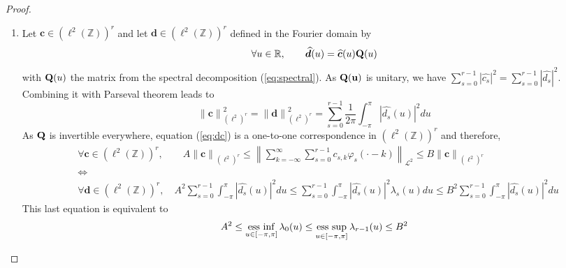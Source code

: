 \begin{proof}
\begin{enumerate}
    \item 
      Let $\bm{c} \in {(\ell^{2}(\mathbb{Z}))}^r$ and let $\bm{d} \in {(\ell^{2}(\mathbb{Z}))}^r$ defined in the Fourier 
      domain by  
      \begin{equation}\label{eq:dc}
	\forall u \in \mathbb{R}, \qquad \widehat{\bm{d}}(u) = \widehat{\bm{c}}(u)\mathbf{Q}(u)
      \end{equation}
      with $\mathbf{Q}(u)$ the matrix from the spectral decomposition (\ref{eq:spectral}). As $\mathbf{Q(u)}$ is unitary, we 
      have $\displaystyle \sum_{s=0}^{r-1} |\widehat{c_s}|^2 = \sum_{s=0}^{r-1} |\widehat{d_s}|^2$. Combining it with 
      Parseval theorem leads to
      \begin{equation*}
      {\|\bm{c}\|}_{{(\ell^2)}^r}^2 = {\|\bm{d}\|}_{{(\ell^2)}^r}^2 = \sum_{s=0}^{r-1} \frac{1}{2\pi} \int_{-\pi}^{\pi} 
      |\widehat{d_s}(u)|^2 du
      \end{equation*}
      As $\mathbf{Q}$ is invertible everywhere, equation (\ref{eq:dc}) is a one-to-one correspondence in 
      ${(\ell^2(\mathbb{Z}))}^r$ and therefore,
      \begin{align*}
	&\forall \bm{c} \in {(\ell^2(\mathbb{Z}))}^r, \qquad A {\|\bm{c}\|}_{{(\ell^2)}^r} \leq {\left\| 
	\sum_{k=-\infty}^{\infty} \sum_{s=0}^{r-1} c_{s,k} \varphi_s(\cdot-k) \right\|}_{\mathcal{L}^2} \leq B 
	{\|\bm{c}\|}_{{(\ell^2)}^r} \\
	  &  \iff \\
	  & \forall \bm{d} \in {(\ell^{2}(\mathbb{Z}))}^r, \quad A^2 \sum_{s=0}^{r-1} \int_{-\pi}^{\pi} 
	  |\widehat{d_s}(u)|^2 du \leq \sum_{s=0}^{r-1} \int_{-\pi}^{\pi} |\widehat{d_s}(u)|^2 \lambda_s(u) du \leq B^2 
	  \sum_{s=0}^{r-1} \int_{-\pi}^{\pi} |\widehat{d_s}(u)|^2 du
      \end{align*}
      This last equation is equivalent to 
      \begin{equation*} A^2 \leq \operatorname*{ess\ inf}_{u \in [-\pi, \pi]} \lambda_{0}(u) \leq \operatorname*{ess\ sup}_{u \in [-\pi, \pi]} 
	\lambda_{r-1}(u) \leq B^2
      \end{equation*}
    \end{enumerate}

\end{proof}
